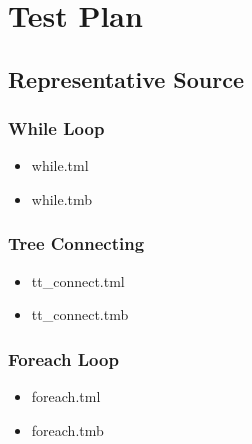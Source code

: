 \documentclass[12pt,psfig,a4]{article}
\begin{document}
\pagebreak
\section{Test Plan}
\subsection{Representative Source}
\subsubsection{While Loop}

\begin{itemize}
\item while.tml
\begin{tt}
\lstset{basicstyle=\footnotesize}

\end{tt}

\item while.tmb
\begin{tt}
\lstset{basicstyle=\footnotesize}

\end{tt}
\end{itemize}

\subsubsection{Tree Connecting}

\begin{itemize}
\item tt\_connect.tml
\begin{tt}
\lstset{basicstyle=\footnotesize}

\end{tt}

\item tt\_connect.tmb
\begin{tt}
\lstset{basicstyle=\footnotesize}

\end{tt}
\end{itemize}

\subsubsection{Foreach Loop}

\begin{itemize}
\item foreach.tml
\begin{tt}
\lstset{basicstyle=\footnotesize}

\end{tt}

\item foreach.tmb
\begin{tt}
\lstset{basicstyle=\footnotesize}

\end{tt}
\end{itemize}
\end{document}
